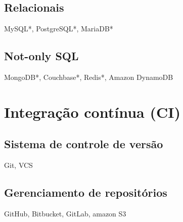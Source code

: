 \subsection{Relacionais}
MySQL*, PostgreSQL*, MariaDB*

\subsection{Not-only SQL}
MongoDB*, Couchbase*, Redis*, Amazon DynamoDB

\section{Integração contínua (CI)}

\subsection{Sistema de controle de versão}
Git, VCS

\subsection{Gerenciamento de repositórios}
GitHub, Bitbucket, GitLab, amazon S3





